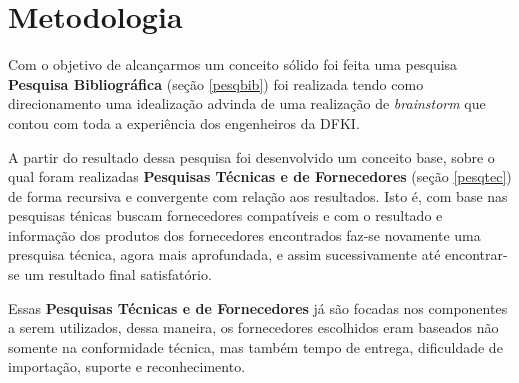


\section{Metodologia}

Com o objetivo de alcançarmos um conceito sólido foi feita uma pesquisa
\textbf{Pesquisa Bibliográfica} (seção \ref{pesqbib}) foi realizada tendo como
direcionamento uma idealização advinda de uma realização de \emph{brainstorm}
que  contou com toda a experiência dos engenheiros da DFKI.

A partir do resultado dessa pesquisa foi desenvolvido um conceito base, sobre o
qual foram realizadas \textbf{Pesquisas Técnicas e de Fornecedores} (seção
\ref{pesqtec}) de forma recursiva e convergente com relação aos resultados. Isto
é, com base nas pesquisas ténicas buscam fornecedores compatíveis e com o
resultado e informação dos produtos dos fornecedores encontrados faz-se
novamente uma presquisa técnica, agora mais aprofundada, e assim sucessivamente
até encontrar-se um resultado final satisfatório.

Essas  \textbf{Pesquisas Técnicas e de Fornecedores} já são focadas nos
componentes a serem utilizados, dessa maneira, os fornecedores escolhidos eram
baseados não somente na conformidade técnica, mas também tempo de entrega,
dificuldade de importação, suporte e reconhecimento.



